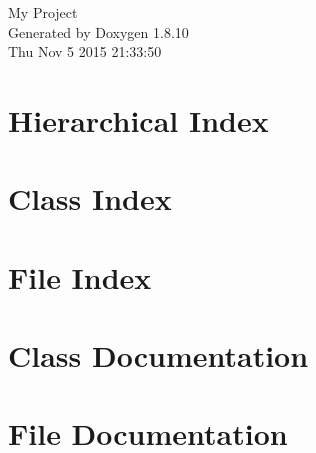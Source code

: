 \documentclass[twoside]{book}
\newcommand{\+}{\discretionary{\mbox{\scriptsize$\hookleftarrow$}}{}{}}
\newcommand{\clearemptydoublepage}{%
  \newpage{\pagestyle{empty}\cleardoublepage}%
}
\begin{document}
\hypersetup{pageanchor=false,
             bookmarks=true,
             bookmarksnumbered=true,
             pdfencoding=unicode
            }
\begin{titlepage}
\vspace*{7cm}
\begin{center}%
{\Large My Project }\\
\vspace*{1cm}
{\large Generated by Doxygen 1.8.10}\\
\vspace*{0.5cm}
{\small Thu Nov 5 2015 21:33:50}\\
\end{center}
\end{titlepage}
\clearemptydoublepage
\tableofcontents
\clearemptydoublepage
{}
\hypersetup{pageanchor=true}

\chapter{Hierarchical Index}

\chapter{Class Index}

\chapter{File Index}

\chapter{Class Documentation}


















\chapter{File Documentation}
































\backmatter
\newpage
{}
\clearemptydoublepage
{}
\printindex
\end{document}
